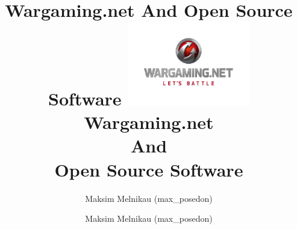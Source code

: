 \documentclass[aspectratio=169]{beamer}
\begin{document}
\title{Wargaming.net And Open Source Software}
\author{Maksim Melnikau (max\_posedon)}
\date{}

{

\title{
    \includegraphics[width=0.4\textwidth]{wg-logo.png}\\
    {\Huge Wargaming.net\\And\\Open Source Software}
}
\author{Maksim Melnikau (max\_posedon)}

\begin{frame}[plain]{}
    \titlepage
\end{frame}

}

\end{document}
